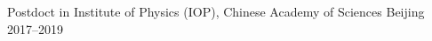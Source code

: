 \documentclass[11pt, a4paper]{awesome-cv}
\begin{document}
\begin{cvskills}
\end{cvskills}
\begin{cventries}
  \cventry
    {Postdoct in }
    {Institute of Physics (IOP), Chinese Academy of Sciences}
    {Beijing}
    {2017--2019}
    {}  %
\end{cventries}
\end{document}
